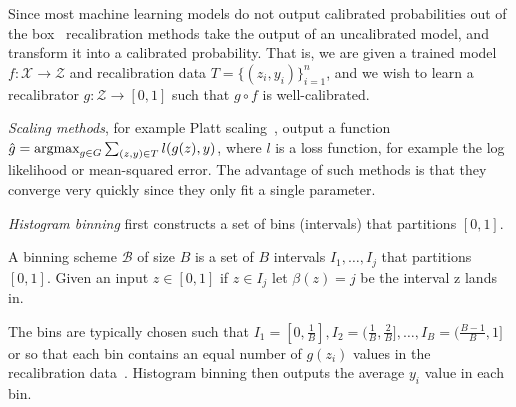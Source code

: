 Since most machine learning models do not output calibrated probabilities out of the box~\cite{guo2017calibration, zadrozny2001calibrated} recalibration methods take the output of an uncalibrated model, and transform it into a calibrated probability. That is, we are given a trained model $f: \mathcal{X} \to \mathcal{Z}$ and recalibration data $T = \{ (z_i, y_i) \}_{i=1}^n$, and we wish to learn a recalibrator $g : \mathcal{Z} \to [0, 1]$ such that $g \circ f$ is well-calibrated.

\emph{Scaling methods}, for example Platt scaling~\cite{platt1999probabilistic}, output a function $\hat{g} = \mathop{\mbox{argmax}}_{g \in G} \sum_{(z, y) \in T} l(g(z), y)$, where $l$  is a loss function, for example the log likelihood  or mean-squared error. The advantage of such methods is that they converge very quickly since they only fit a single parameter.

\emph{Histogram binning} first constructs a set of bins (intervals) that partitions $[0, 1]$.

\begin{definition}
A binning scheme $\mathcal{B}$ of size $B$ is a set of $B$ intervals $I_1, \dots, I_j$ that partitions $[0, 1]$. Given an input $z \in [0, 1]$ if $z \in I_j$ let $\beta(z) = j$ be the interval z lands in.
\end{definition}

The bins are typically chosen such that $I_1 = [0, \frac{1}{B}], I_2 = (\frac{1}{B}, \frac{2}{B}], \dots, I_B = (\frac{B-1}{B}, 1]$ or so that each bin contains an equal number of $g(z_i)$ values in the recalibration data~\cite{zadrozny2001calibrated, guo2017calibration}.  Histogram binning then outputs the average $y_i$ value in each bin.
